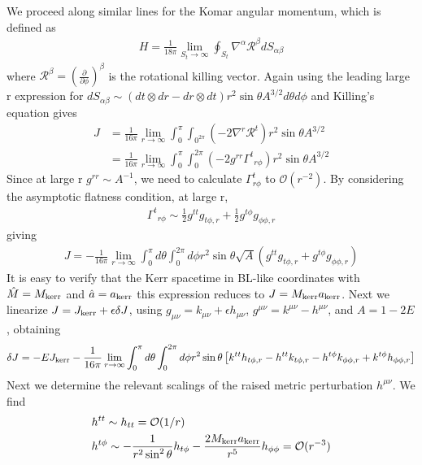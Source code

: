 \documentclass[aps,prd,amsmath,showpacs,amssymb,superscriptaddress,nofootinbib,longbibliography,eqsecnum,preprintnumbers]{revtex4-1}
\begin{document}
We proceed along similar lines for the Komar angular momentum, which is defined as
\begin{align}
H =\frac{1}{18\pi} \lim_{S_{t}\to \infty} \oint_{S_t}\nabla^\alpha \mathcal{R}^\beta dS_{\alpha\beta}
\end{align}
where $\mathcal{R}^\beta =\left(\frac{\partial}{\partial \phi}\right)^\beta$ is the rotational killing vector. Again using the leading large r expression for $dS_{\alpha \beta}\sim (dt \otimes dr -dr \otimes dt)r^2\sin\theta A^{3/2}d\theta d\phi$ and Killing's equation gives
\begin{align}
J&=\frac{1}{16\pi}\lim_{r\to \infty}\int_{0}^\pi\int_{0^{2\pi}}(-2\nabla^r \mathcal{R}^t)r^2\sin\theta A^{3/2} \nonumber \\
&=\frac{1}{16\pi}\lim_{r\to \infty}\int_{0}^\pi\int_0^{2\pi}(-2g^{rr}\Gamma^t{}_{r\phi})r^2\sin\theta A^{3/2}
\end{align}
Since at large r $g^{rr}\sim A^{-1}$, we need to calculate $\Gamma^{t}_{r\phi}$ to $\mathcal{O}(r^{-2})$. By considering the asymptotic flatness condition, at large r,
\begin{align}
\Gamma^{t}{}_{r\phi}\sim \frac{1}{2}g^{tt}g_{t\phi,r}+\frac{1}{2}g^{t\phi}g_{\phi\phi,r}
\end{align}
giving
\begin{align}
J=-\frac{1}{16\pi}\lim_{r\to \infty}\int_{0}^\pi d\theta \int_{0}^{2\pi}d\phi r^2\sin\theta \sqrt{A}\left(g^{tt}g_{t\phi,r}+g^{t\phi}g_{\phi\phi,r}\right)
\end{align}
It is easy to verify that the Kerr spacetime in BL-like coordinates with $\hat M = M_{\rm kerr}$  and $\hat a =a_{\rm kerr}$ this expression reduces to $J=M_{\rm kerr}a_{\rm kerr}$. Next we linearize $J=J_{\rm kerr}+\epsilon \delta J$, using $g_{\mu \nu}=k_{\mu\nu}+\epsilon h_{\mu \nu}$, $g^{\mu \nu }=k^{\mu \nu }-h^{\mu\nu}$, and $A=1-2E$, obtaining
\begin{align}
\delta J =-E J_{\rm kerr}-\frac{1}{16\pi}\lim_{r\to \infty}\int_{0}^{\pi}d\theta \int_{0}^{2\pi}d\phi r^2\sin\theta\left[k^{tt}h_{t\phi,r}-h^{tt}k_{t\phi,r}-h^{t\phi}k_{\phi\phi,r}+k^{t\phi}h_{\phi\phi,r}\right]
\end{align}
Next we determine the relevant scalings of the raised metric perturbation $h^{\mu\nu}$. We find
\begin{align}
&h^{tt}\sim h_{tt}=\mathcal{O}(1/r) \nonumber \\
&h^{t\phi}\sim -\frac{1}{r^2\sin^2\theta}h_{t\phi}-\frac{2M_{\rm kerr}a_{\rm kerr}}{r^5}h_{\phi \phi} =\mathcal{O}(r^{-3})
\end{align}
\end{document}
